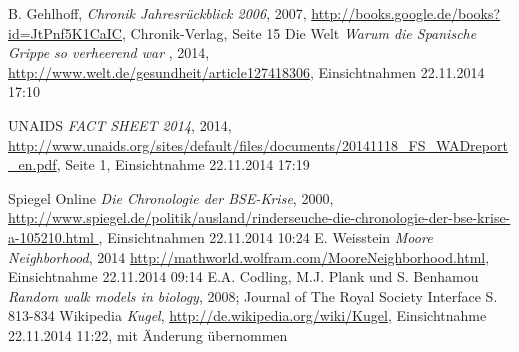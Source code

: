 \documentclass[10pt,twocolumn]{scrartcl}
\begin{document}


%
%

\begin{thebibliography}{99}
B. Gehlhoff,  \textit{Chronik Jahresrückblick 2006}, 2007,
\url{http://books.google.de/books?id=JtPnf5K1CaIC},
Chronik-Verlag, Seite 15
Die Welt {\it Warum die Spanische Grippe so verheerend war} , 2014, \url{http://www.welt.de/gesundheit/article127418306}, Einsichtnahmen 22.11.2014 17:10
	
UNAIDS {\it FACT SHEET 2014}, 2014,
	\url{http://www.unaids.org/sites/default/files/documents/20141118_FS_WADreport_en.pdf},
	Seite 1, Einsichtnahme 22.11.2014 17:19

	
	
Spiegel Online {\it Die Chronologie der BSE-Krise}, 2000, \url{
	http://www.spiegel.de/politik/ausland/rinderseuche-die-chronologie-der-bse-krise-a-105210.html
	}, Einsichtnahmen 22.11.2014 10:24
E. Weisstein {\it Moore Neighborhood}, 2014 \url{http://mathworld.wolfram.com/MooreNeighborhood.html}, Einsichtnahme 22.11.2014 09:14
E.A. Codling, M.J. Plank und S. Benhamou {\it Random walk models in biology}, 2008; Journal of The Royal Society Interface S. 813-834
Wikipedia {\it Kugel}, \url{http://de.wikipedia.org/wiki/Kugel}, Einsichtnahme 22.11.2014 11:22, mit Änderung übernommen


\end{thebibliography}
\end{document}

